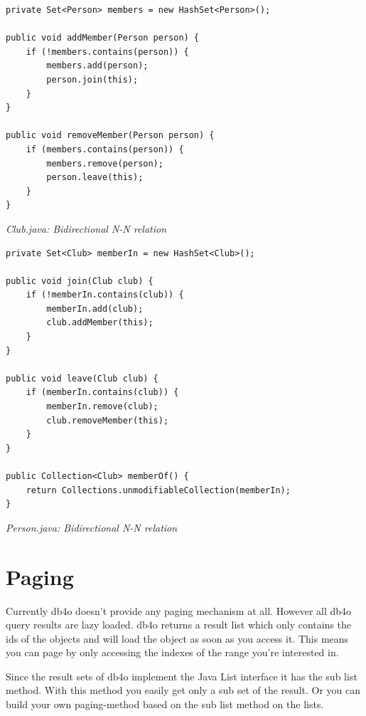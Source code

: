 \begin{lstlisting}
private Set<Person> members = new HashSet<Person>();

public void addMember(Person person) {
    if (!members.contains(person)) {
        members.add(person);
        person.join(this);
    }
}

public void removeMember(Person person) {
    if (members.contains(person)) {
        members.remove(person);
        person.leave(this);
    }
}
\end{lstlisting}

{\small\itshape Club.java: Bidirectional N-N relation\par}
\medskip

\begin{lstlisting}
private Set<Club> memberIn = new HashSet<Club>();

public void join(Club club) {
    if (!memberIn.contains(club)) {
        memberIn.add(club);
        club.addMember(this);
    }
}

public void leave(Club club) {
    if (memberIn.contains(club)) {
        memberIn.remove(club);
        club.removeMember(this);
    }
}

public Collection<Club> memberOf() {
    return Collections.unmodifiableCollection(memberIn);
}
\end{lstlisting}

{\small\itshape Person.java: Bidirectional N-N relation\par}
\medskip

\section{Paging}
\label{ref:best-practises-paging}

Currently db4o doesn't provide any paging mechanism at all. However all db4o query results are lazy loaded. db4o returns a result list which only contains the ids of the objects and will load the object as soon as you access it. This means you can page by only accessing the indexes of the range you're interested in.

Since the result sets of db4o implement the Java List interface it has the sub list method. With this method you easily get only a sub set of the result. Or you can build your own paging-method based on the sub list method on the lists.

